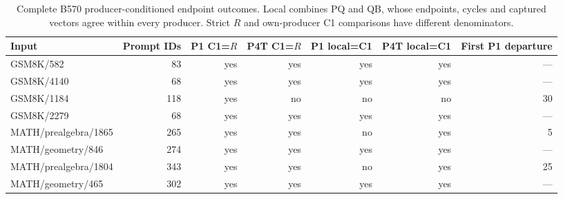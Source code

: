 \begin{table}[t]\centering\small
\caption{Complete B570 producer-conditioned endpoint outcomes. Local combines PQ and QB, whose endpoints, cycles and captured vectors agree within every producer. Strict $R$ and own-producer C1 comparisons have different denominators.}\label{tab:producerfull}
\begin{tabular}{@{}lrrrrrr@{}}\toprule
Input & Prompt IDs & P1 C1=$R$ & P4T C1=$R$ & P1 local=C1 & P4T local=C1 & First P1 departure\\\midrule
GSM8K/582 & 83 & yes & yes & yes & yes & ---\\
GSM8K/4140 & 68 & yes & yes & yes & yes & ---\\
GSM8K/1184 & 118 & yes & no & no & no & 30\\
GSM8K/2279 & 68 & yes & yes & yes & yes & ---\\
MATH/prealgebra/1865 & 265 & yes & yes & no & yes & 5\\
MATH/geometry/846 & 274 & yes & yes & yes & yes & ---\\
MATH/prealgebra/1804 & 343 & yes & yes & no & yes & 25\\
MATH/geometry/465 & 302 & yes & yes & yes & yes & ---\\
\bottomrule\end{tabular}
\end{table}
